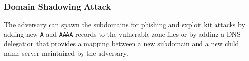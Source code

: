 \begin{comment}
\end{comment}






\subsubsection{Domain Shadowing Attack}

The adversary can spawn the subdomains for phishing and exploit kit attacks by adding new \texttt{A} and \texttt{AAAA} records to the vulnerable zone files or by adding a DNS delegation that provides a mapping between a new subdomain and a new child name server maintained by the adversary. %

